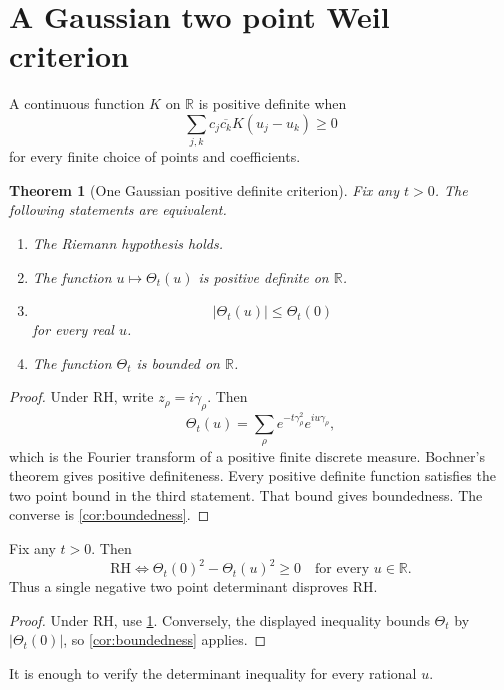 \documentclass{aomart}
\newtheorem{theorem}{Theorem}[section]
\theoremstyle{definition}
\theoremstyle{remark}
\newcommand{\RR}{\mathbb R}
\newcommand{\abs}[1]{\left\lvert#1\right\rvert}
\begin{document}
\section{A Gaussian two point Weil criterion}\label{sec:two_point}

A continuous function \(K\) on \(\RR\) is positive definite when
\[
 \sum_{j,k}c_j\overline{c_k}K(u_j-u_k)\geq0
\]
for every finite choice of points and coefficients.

\begin{theorem}[One Gaussian positive definite criterion]\label{thm:positive_definite}
Fix any \(t>0\). The following statements are equivalent.

\begin{enumerate}
\item The Riemann hypothesis holds.
\item The function \(u\mapsto\Theta_t(u)\) is positive definite on \(\RR\).
\item
\[
 \boxed{
 \abs{\Theta_t(u)}\leq\Theta_t(0)
 }
\]
for every real \(u\).
\item The function \(\Theta_t\) is bounded on \(\RR\).
\end{enumerate}
\end{theorem}

\begin{proof}
Under RH, write \(z_\rho=i\gamma_\rho\). Then
\[
 \Theta_t(u)
 =
 \sum_\rho
 e^{-t\gamma_\rho^2}e^{iu\gamma_\rho},
\]
which is the Fourier transform of a positive finite discrete measure. Bochner's theorem gives positive definiteness. Every positive definite function satisfies the two point bound in the third statement. That bound gives boundedness. The converse is \cref{cor:boundedness}.
\end{proof}

\begin{corollary}\label{cor:two_point_determinant}
Fix any \(t>0\). Then
\[
 \boxed{
 \mathrm{RH}
 \iff
 \Theta_t(0)^2-\Theta_t(u)^2\geq0
 \quad\text{for every }u\in\RR.
 }
\]
Thus a single negative two point determinant disproves RH.
\end{corollary}

\begin{proof}
Under RH, use \cref{thm:positive_definite}. Conversely, the displayed inequality bounds \(\Theta_t\) by \(\abs{\Theta_t(0)}\), so \cref{cor:boundedness} applies.
\end{proof}

\begin{corollary}\label{cor:countable_hierarchy}
It is enough to verify the determinant inequality for every rational \(u\).
\end{corollary}
\end{document}
